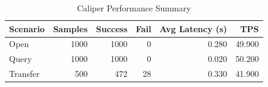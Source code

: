\begin{table}
\caption{Caliper Performance Summary}
\label{tab:caliper_round}
\begin{tabular}{lrrrrr}
\toprule
Scenario & Samples & Success & Fail & Avg Latency (s) & TPS \\
\midrule
Open & 1000 & 1000 & 0 & 0.280 & 49.900 \\
Query & 1000 & 1000 & 0 & 0.020 & 50.200 \\
Transfer & 500 & 472 & 28 & 0.330 & 41.900 \\
\bottomrule
\end{tabular}
\end{table}
